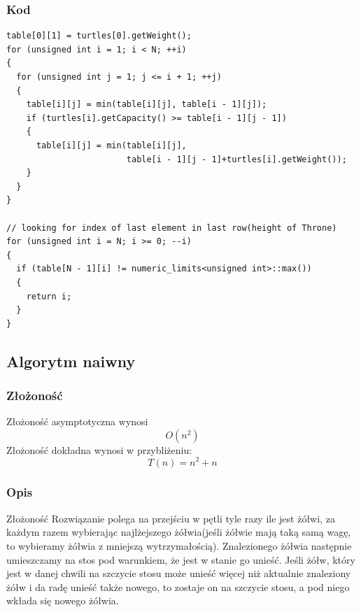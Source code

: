 \documentclass[11pt,a4paper]{article}
\begin{document}
\subsubsection{Kod}
\begin{lstlisting}
table[0][1] = turtles[0].getWeight();
for (unsigned int i = 1; i < N; ++i)
{
  for (unsigned int j = 1; j <= i + 1; ++j)
  {
    table[i][j] = min(table[i][j], table[i - 1][j]);
    if (turtles[i].getCapacity() >= table[i - 1][j - 1])
    {
      table[i][j] = min(table[i][j],
                        table[i - 1][j - 1]+turtles[i].getWeight());
    }
  }
}

// looking for index of last element in last row(height of Throne)
for (unsigned int i = N; i >= 0; --i)
{
  if (table[N - 1][i] != numeric_limits<unsigned int>::max())
  {
    return i;
  }
}
\end{lstlisting}


\subsection{Algorytm naiwny}
\subsubsection{Złożoność}
Złożoność asymptotyczna wynosi 
\begin{equation}
O(n^2)
\end{equation}
Złożoność dokładna wynosi w przybliżeniu:
\begin{equation}
T(n)=n^2+n
\end{equation}

\subsubsection{Opis}
Złożoność
Rozwiązanie polega na przejściu w pętli tyle razy ile jest żółwi, za każdym razem wybierając najlżejszego żółwia(jeśli żółwie mają taką samą wagę, to wybieramy żółwia z mniejszą wytrzymałością). Znalezionego żółwia następnie umieszczamy na stos pod warunkiem, że jest w stanie go unieść. Jeśli żółw, który jest w danej chwili na szczycie stosu może unieść więcej niż aktualnie znaleziony żółw i da radę unieść także nowego, to zostaje on na szczycie stosu, a pod niego wkłada się nowego żółwia.
\end{document}
